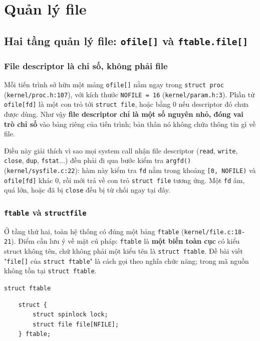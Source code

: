 \chapter{Quản lý file}

\newpage

\section{Hai tầng quản lý file: \texttt{ofile[]} và \texttt{ftable.file[]}}

\subsection{File descriptor là chỉ số, không phải file}

Mỗi tiến trình sở hữu một mảng \texttt{ofile[]} nằm ngay trong \texttt{struct proc} (\texttt{kernel/proc.h:107}), với kích thước \texttt{NOFILE = 16} (\texttt{kernel/param.h:3}). Phần tử \texttt{ofile[fd]} là một con trỏ tới \texttt{struct file}, hoặc bằng 0 nếu descriptor đó chưa được dùng. Như vậy \textbf{file descriptor chỉ là một số nguyên nhỏ, đóng vai trò chỉ số} vào bảng riêng của tiến trình; bản thân nó không chứa thông tin gì về file.

Điều này giải thích vì sao mọi system call nhận file descriptor (\texttt{read}, \texttt{write}, \texttt{close}, \texttt{dup}, \texttt{fstat}...) đều phải đi qua bước kiểm tra \texttt{argfd()} (\texttt{kernel/sysfile.c:22}): hàm này kiểm tra \texttt{fd} nằm trong khoảng \texttt{[0, NOFILE)} và \texttt{ofile[fd]} khác 0, rồi mới trả về con trỏ \texttt{struct file} tương ứng. Một \texttt{fd} âm, quá lớn, hoặc đã bị \texttt{close} đều bị từ chối ngay tại đây.

\subsection{\texttt{ftable} và \texttt{structfile}}

Ở tầng thứ hai, toàn hệ thống có đúng một bảng \texttt{ftable} (\texttt{kernel/file.c:18-21}). Điểm cần lưu ý về mặt cú pháp: \texttt{ftable} là \textbf{một biến toàn cục} có kiểu struct không tên, chứ không phải một kiểu tên là \texttt{struct ftable}. Đề bài viết "\texttt{file[]} của \texttt{struct ftable}" là cách gọi theo nghĩa chức năng; trong mã nguồn không tồn tại \texttt{struct ftable}.

\begin{codebox}[1]{\texttt{struct ftable}}
    \begin{verbatim}
    struct {
        struct spinlock lock;
        struct file file[NFILE];
    } ftable;
    \end{verbatim}
\end{codebox}

